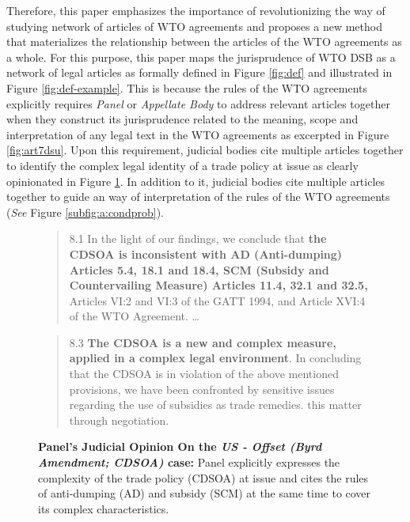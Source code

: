Therefore, this paper emphasizes the importance of revolutionizing the way of studying network of articles of WTO agreements and proposes a new method that
materializes the relationship between the articles of the WTO agreements as a whole.
For this purpose, this paper maps
the jurisprudence of WTO DSB
as a network of legal articles
as formally defined in Figure \ref{fig:def} and illustrated in Figure \ref{fig:def-example}. This is because the rules of the WTO agreements
explicitly requires \textit{Panel} or \textit{Appellate Body} to address
relevant articles together when they construct its jurisprudence related to the meaning, scope and interpretation of any legal text in the WTO agreements as excerpted in Figure \ref{fig:art7dsu}.
Upon this requirement, judicial bodies cite
multiple articles together
to identify the complex legal identity of a trade policy at issue as clearly opinionated in Figure \ref{fig:complex-measure}.
In addition to it, judicial bodies cite multiple articles together
to guide an way of interpretation of the rules of the WTO agreements (\textit{See} Figure \ref{subfig:a:condprob}).
\begin{figure}[h]
  \begin{quote}
      8.1 In the light of our findings, we conclude that \textbf{the CDSOA is inconsistent with AD (Anti-dumping)
      Articles 5.4, 18.1 and 18.4, SCM (Subsidy and Countervailing Measure) Articles 11.4, 32.1 and 32.5,} Articles VI:2 and VI:3 of the GATT
      1994, and Article XVI:4 of the WTO Agreement. \ldots
  \end{quote}
  \begin{quote}
      8.3 \textbf{The CDSOA is a new and complex measure, applied in a complex legal environment}. In
      concluding that the CDSOA is in violation of the above mentioned provisions, we have been
      confronted by sensitive issues regarding the use of subsidies as trade remedies.
      this matter through negotiation.
  \end{quote}
  \caption{\textbf{Panel's Judicial Opinion On the \textit{US - Offset (Byrd Amendment; CDSOA)} case:} Panel explicitly expresses the complexity of the trade policy (CDSOA) at issue and cites the rules of anti-dumping (AD) and subsidy (SCM) at the same time to cover its complex characteristics.}
  \label{fig:complex-measure}
\end{figure}
